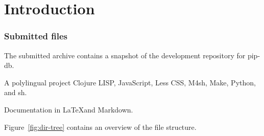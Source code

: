 \chapter{Introduction}\label{chap:introduction}







\subsection*{Submitted files}

The submitted archive contains a snapshot of the development
repository for pip-db.

A polylingual project Clojure LISP, JavaScript, Less CSS, M4sh, Make,
Python, and sh.

Documentation in \LaTeX and Markdown.

Figure~\ref{fig:dir-tree} contains an overview of the file structure.


